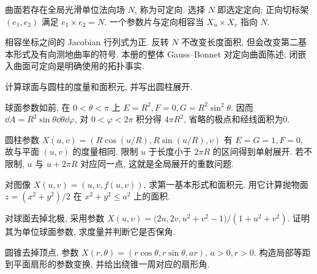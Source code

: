 \begin{definition}
曲面若存在全局光滑单位法向场 $N$, 称为可定向. 选择 $N$ 即选定定向; 正向切标架 $(e_1,e_2)$ 满足 $e_1\times e_2=N$. 一个参数片与定向相容当 $X_u\times X_v$ 指向 $N$.
\end{definition}
相容坐标之间的 Jacobian 行列式为正. 反转 $N$ 不改变长度面积, 但会改变第二基本形式及有向测地曲率的符号. 本册的整体 Gauss--Bonnet 对定向曲面陈述; 闭嵌入曲面可定向是明确使用的拓扑事实.
\begin{example}
计算球面与圆柱的度量和面积元, 并写出圆柱展开.
\end{example}
\begin{solution}
球面参数如前, 在 $0<\theta<\pi$ 上 $E=R^2,F=0,G=R^2\sin^2\theta$. 因而 $\dd A=R^2\sin\theta\dd\theta\dd\varphi$, 对 $0<\varphi<2\pi$ 积分得 $4\pi R^2$, 省略的极点和经线面积为0.

圆柱参数 $X(u,v)=(R\cos(u/R),R\sin(u/R),v)$ 有 $E=G=1,F=0$, 故与平面 $(u,v)$ 的度量相同. 限制 $u$ 于长度小于 $2\pi R$ 的区间得到单射展开. 若不限制, $u$ 与 $u+2\pi R$ 对应同一点, 这就是全局展开的重数问题.
\end{solution}
\begin{exercise}\label{ex:4a}
对图像 $X(u,v)=(u,v,f(u,v))$, 求第一基本形式和面积元. 用它计算抛物面 $z=(x^2+y^2)/2$ 在 $x^2+y^2\le a^2$ 上的面积.
\end{exercise}
\begin{exercise}\label{ex:4b}
对球面去掉北极, 采用参数 $X(u,v)=\bigl(2u,2v,u^2+v^2-1\bigr)/(1+u^2+v^2)$. 证明其为单位球面参数, 求度量并判断它是否保角.
\end{exercise}
\begin{exercise}\label{ex:4c}
圆锥去掉顶点, 参数 $X(r,\theta)=(r\cos\theta,r\sin\theta,ar)$, $a>0,r>0$. 构造局部等距到平面扇形的参数变换, 并给出绕锥一周对应的扇形角.
\end{exercise}
